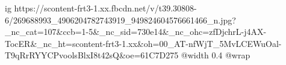  
 
 
 
 

\ifcmt
  ig https://scontent-frt3-1.xx.fbcdn.net/v/t39.30808-6/269688993_4906204782743919_949824604576661466_n.jpg?_nc_cat=107&ccb=1-5&_nc_sid=730e14&_nc_ohc=zfDjchrL-j4AX-TocER&_nc_ht=scontent-frt3-1.xx&oh=00_AT-nfWjT_5MvLCEWuOal-T9qRrRYYCPvoolsBlxI8t42sQ&oe=61C7D275
  @width 0.4
  @wrap 
\fi
